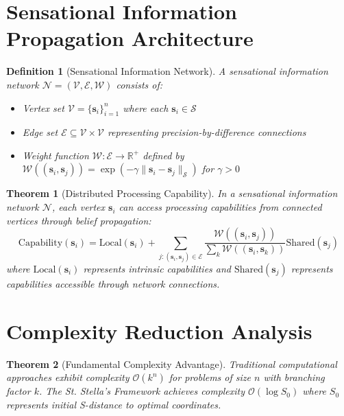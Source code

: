 \documentclass[12pt,a4paper]{article}
\newtheorem{theorem}{Theorem}
\newtheorem{definition}{Definition}
\begin{document}
\section{Sensational Information Propagation Architecture}

\begin{definition}[Sensational Information Network]
\label{def:sensational_network}
A sensational information network $\mathcal{N} = (\mathcal{V}, \mathcal{E}, \mathcal{W})$ consists of:
\begin{itemize}
\item Vertex set $\mathcal{V} = \{\mathbf{s}_i\}_{i=1}^n$ where each $\mathbf{s}_i \in \mathcal{S}$
\item Edge set $\mathcal{E} \subseteq \mathcal{V} \times \mathcal{V}$ representing precision-by-difference connections
\item Weight function $\mathcal{W}: \mathcal{E} \to \mathbb{R}^+$ defined by $\mathcal{W}((\mathbf{s}_i, \mathbf{s}_j)) = \exp(-\gamma \|\mathbf{s}_i - \mathbf{s}_j\|_{\mathcal{S}})$ for $\gamma > 0$
\end{itemize}
\end{definition}

\begin{theorem}[Distributed Processing Capability]
\label{thm:distributed_processing}
In a sensational information network $\mathcal{N}$, each vertex $\mathbf{s}_i$ can access processing capabilities from connected vertices through belief propagation:
\begin{equation}
\text{Capability}(\mathbf{s}_i) = \text{Local}(\mathbf{s}_i) + \sum_{j: (\mathbf{s}_i, \mathbf{s}_j) \in \mathcal{E}} \frac{\mathcal{W}((\mathbf{s}_i, \mathbf{s}_j))}{\sum_{k} \mathcal{W}((\mathbf{s}_i, \mathbf{s}_k))} \text{Shared}(\mathbf{s}_j)
\end{equation}
where $\text{Local}(\mathbf{s}_i)$ represents intrinsic capabilities and $\text{Shared}(\mathbf{s}_j)$ represents capabilities accessible through network connections.
\end{theorem}

\section{Complexity Reduction Analysis}

\begin{theorem}[Fundamental Complexity Advantage]
\label{thm:complexity_advantage}
Traditional computational approaches exhibit complexity $\mathcal{O}(k^n)$ for problems of size $n$ with branching factor $k$. The St. Stella's Framework achieves complexity $\mathcal{O}(\log S_0)$ where $S_0$ represents initial S-distance to optimal coordinates.
\end{theorem}
\end{document}

